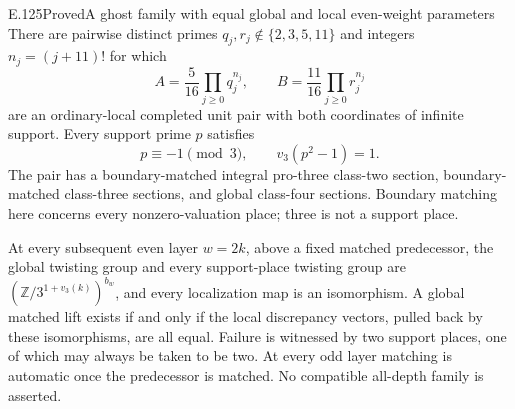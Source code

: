 \begin{result}{E.125}{Proved}{A ghost family with equal global and local even-weight parameters}
There are pairwise distinct primes $q_j,r_j\notin\{2,3,5,11\}$
and integers $n_j=(j+11)!$ for which
\[
 A=\frac5{16}\prod_{j\geq0}q_j^{n_j},\qquad
 B=\frac{11}{16}\prod_{j\geq0}r_j^{n_j}
 \tag{E.125.1}
\]
are an ordinary-local completed unit pair with both coordinates
of infinite support. Every support prime $p$ satisfies
\[
        p\equiv-1\pmod3,\qquad v_3(p^2-1)=1.
 \tag{E.125.2}
\]
The pair has a boundary-matched integral pro-three class-two
section, boundary-matched class-three sections, and global
class-four sections. Boundary matching here concerns every
nonzero-valuation place; three is not a support place.

At every subsequent even layer $w=2k$, above a fixed matched
predecessor, the global twisting group and every support-place
twisting group are $(\mathbb Z/3^{1+v_3(k)})^{b_w}$, and every
localization map is an isomorphism. A global matched lift exists
if and only if the local discrepancy vectors, pulled back by
these isomorphisms, are all equal. Failure is witnessed by two
support places, one of which may always be taken to be two.
At every odd layer matching is automatic once the predecessor
is matched. No compatible all-depth family is asserted.
\end{result}
